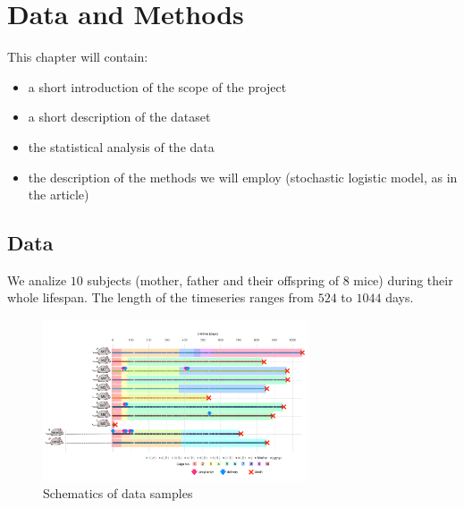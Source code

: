 \chapter{Data and Methods}

This chapter will contain:

\begin{itemize}

    \item a short introduction of the scope of the project
    \item a short description of the dataset
    \item the statistical analysis of the data
    \item the description of the methods we will employ (stochastic logistic model, as in the article)
    
\end{itemize}


\section{Data}
We analize $10$ subjects (mother, father and their offspring of $8$ mice) during their whole lifespan. The length of the 
timeseries ranges from $524$ to $1044$ days. 


\begin{figure}
    \includegraphics[width = 0.7\textwidth]{../../Figures/Chapter_1/fig_data.pdf}
    \caption{Schematics of data samples}
\end{figure}